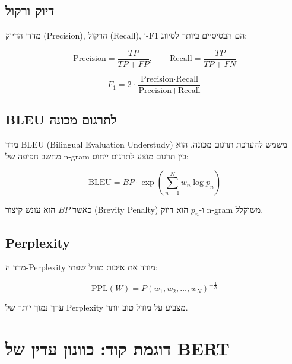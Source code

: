 \subsection{דיוק ורקול}

מדדי הדיוק (\textenglish{Precision}), הרקול (\textenglish{Recall}),
ו-\textenglish{F1} הם הבסיסיים ביותר לסיווג:

\begin{equation}
    \text{Precision} = \frac{TP}{TP + FP}, \qquad
    \text{Recall}    = \frac{TP}{TP + FN}
\end{equation}

\begin{equation}
    F_1 = 2 \cdot \frac{\text{Precision} \cdot \text{Recall}}
                       {\text{Precision} + \text{Recall}}
\end{equation}

\subsection{\textenglish{BLEU} לתרגום מכונה}

מדד \textenglish{BLEU} (\textenglish{Bilingual Evaluation Understudy})
משמש להערכת תרגום מכונה. הוא מחשב חפיפה של \textenglish{n-gram}
בין תרגום מוצע לתרגום ייחוס:

\begin{equation}
    \text{BLEU} = BP \cdot \exp\!\left( \sum_{n=1}^{N} w_n \log p_n \right)
\end{equation}

כאשר \(BP\) הוא עונש קיצור (\textenglish{Brevity Penalty}) ו-\(p_n\) הוא
דיוק \textenglish{n-gram} משוקלל.

\subsection{\textenglish{Perplexity}}

מדד ה-\textenglish{Perplexity} מודד את איכות מודל שפתי:

\begin{equation}
    \text{PPL}(W) = P(w_1, w_2, \ldots, w_N)^{-\frac{1}{N}}
\end{equation}

ערך נמוך יותר של \textenglish{Perplexity} מצביע על מודל טוב יותר.

\section{דוגמת קוד: כוונון עדין של \textenglish{BERT}}


